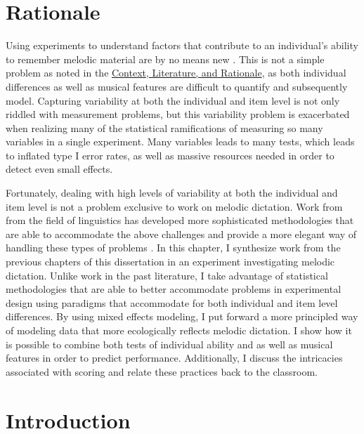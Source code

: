 \documentclass[12pt,]{book}
\begin{document}
\hypertarget{rationale-4}{%
\section{Rationale}\label{rationale-4}}

Using experiments to understand factors that contribute to an individual's ability to remember melodic material are by no means new \citep{ortmannTonalDeterminantsMelodic1933}.
This is not a simple problem as noted in the \protect\hyperlink{intro}{Context, Literature, and Rationale}, as both individual differences as well as musical features are difficult to quantify and subsequently model.
Capturing variability at both the individual and item level is not only riddled with measurement problems, but this variability problem is exacerbated when realizing many of the statistical ramifications of measuring so many variables in a single experiment.
Many variables leads to many tests, which leads to inflated type I error rates, as well as massive resources needed in order to detect even small effects.

Fortunately, dealing with high levels of variability at both the individual and item level is not a problem exclusive to work on melodic dictation.
Work from from the field of linguistics has developed more sophisticated methodologies that are able to accommodate the above challenges and provide a more elegant way of handling these types of problems \citep{baayenMixedeffectsModelingCrossed2008}.
In this chapter, I synthesize work from the previous chapters of this dissertation in an experiment investigating melodic dictation.
Unlike work in the past literature, I take advantage of statistical methodologies that are able to better accommodate problems in experimental design using paradigms that accommodate for both individual and item level differences.
By using mixed effects modeling, I put forward a more principled way of modeling data that more ecologically reflects melodic dictation.
I show how it is possible to combine both tests of individual ability and as well as musical features in order to predict performance.
Additionally, I discuss the intricacies associated with scoring and relate these practices back to the classroom.

\hypertarget{introduction}{%
\section{Introduction}\label{introduction}}
\end{document}
